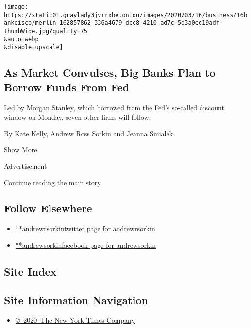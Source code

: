 \begin{enumerate}
  \texttt{[image: https://static01.graylady3jvrrxbe.onion/images/2020/03/16/business/16bankdisco/merlin\_162857862\_336a4679-dcc8-4210-ad7c-5d3a0ed19adf-thumbWide.jpg?quality=75\\\&auto=webp\\\&disable=upscale]}

  \hypertarget{as-market-convulses-big-banks-plan-to-borrow-funds-from-fed}{%
  \subsection{As Market Convulses, Big Banks Plan to Borrow Funds From
  Fed}\label{as-market-convulses-big-banks-plan-to-borrow-funds-from-fed}}

  Led by Morgan Stanley, which borrowed from the Fed's so-called
  discount window on Monday, seven other firms will follow.

  By Kate Kelly, Andrew Ross Sorkin and Jeanna Smialek
\end{enumerate}

Show More

Advertisement

\protect\hyperlink{after-mid2}{Continue reading the main story}

\hypertarget{follow-elsewhere}{%
\subsection{Follow Elsewhere}\label{follow-elsewhere}}

\begin{itemize}
\tightlist
\item
  \href{https://twitter.com/andrewrsorkin}{**andrewrsorkintwitter page
  for andrewrsorkin}
\item
  \href{https://www.facebookcorewwwi.onion/andrewsorkin}{**andrewsorkinfacebook
  page for andrewsorkin}
\end{itemize}

\hypertarget{site-index}{%
\subsection{Site Index}\label{site-index}}

\hypertarget{site-information-navigation}{%
\subsection{Site Information
Navigation}\label{site-information-navigation}}

\begin{itemize}
\tightlist
\item
  \href{https://help.nytimes3xbfgragh.onion/hc/en-us/articles/115014792127-Copyright-notice}{©~2020~The
  New York Times Company}
\end{itemize}

